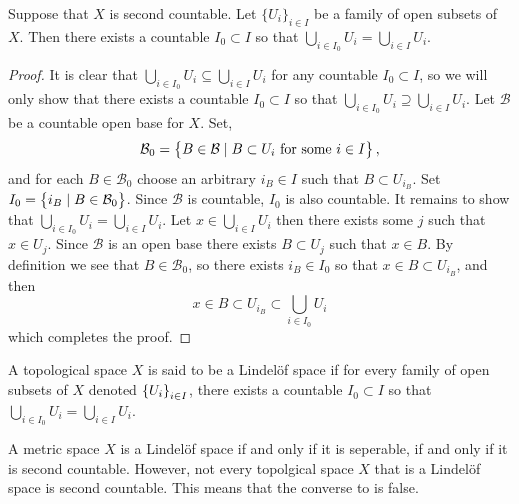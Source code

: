 \documentclass[11pt,a4paper]{article}
\begin{document}
\begin{theorem}
  \label{thm:lindelof}
  Suppose that $X$ is second countable. Let
  $\{U_i\}_{i \in I}$ be a family of open subsets of $X$. Then there
  exists a countable $I_0 \subset I$ so that 
  $\bigcup_{i \in I_{0}}{U_i} = \bigcup_{i \in I}{U_i}$.
\end{theorem}
\begin{proof}
  It is clear that
  $\bigcup_{i \in I_{0}}{U_i} \subseteq \bigcup_{i \in I}{U_i}$
  for any countable $I_0 \subset I$,
  so we will only show that there exists a countable $I_0 \subset I$
  so that $\bigcup_{i \in I_{0}}{U_i} \supseteq \bigcup_{i \in I}{U_i}$.
  Let $\mathcal{B}$ be a countable open base for $X$. Set,
  \[
    \mathcal{B}_0 = \left\{B \in \mathcal{B} \mid B \subset U_i
    \text{ for some } i \in I\right\},
  \]
  and for each $B \in \mathcal{B}_0$ choose an arbitrary $i_B \in I$ such
  that $B \subset U_{i_B}$. Set $I_0 = \left\{i_B \mid B \in \mathcal{B}_0\right\}$.
  Since $\mathcal{B}$ is countable, $I_0$ is also countable. It remains
  to show that $\bigcup_{i \in I_{0}}{U_i} = \bigcup_{i \in I}{U_i}$. Let
  $x \in \bigcup_{i \in I}{U_i}$ then there exists some $j$
  such that $x \in U_j$.
  Since $\mathcal{B}$ is an open base there exists $B \subset U_j$ such that
  $x \in B$. By definition we see that $B \in \mathcal{B}_0$,
  so there exists $i_B \in I_0$ so that $x \in B \subset U_{i_B}$, and then
  \[
    x \in B \subset U_{i_B} \subset \bigcup_{i \in I_{0}}{U_i}
  \]
  which completes the proof.
\end{proof}

\begin{definition}
  A topological space $X$ is said to be a Lindel\"of space if for every
  family of open subsets of $X$ denoted $\left\{U_i\right\}_{i \in I}$,
  there exists a countable $I_0 \subset I$ so that 
  $\bigcup_{i \in I_{0}}{U_i} = \bigcup_{i \in I}{U_i}$.
\end{definition}
\begin{remark}
  A metric space $X$ is a Lindel\"of space if and only if it is seperable,
  if and only if it is second countable.
  However, not every topolgical space $X$ that is a Lindel\"of space
  is second countable.
  This means that the converse to  is false.
\end{remark}
\end{document}
